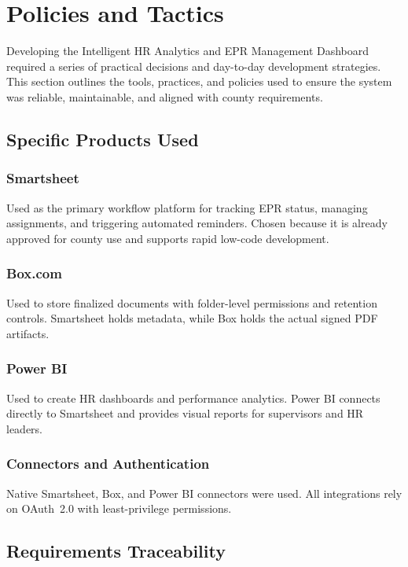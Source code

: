 \documentclass[12pt]{article}
\def\&{ and }%
\begin{document}
\section{Policies and Tactics}

Developing the Intelligent HR Analytics \& EPR Management Dashboard required a series of
practical decisions and day-to-day development strategies. This section outlines the tools,
practices, and policies used to ensure the system was reliable, maintainable, and aligned with
county requirements.

\subsection{Specific Products Used}

\subsubsection{Smartsheet}
Used as the primary workflow platform for tracking EPR status, managing assignments, and
triggering automated reminders. Chosen because it is already approved for county use and
supports rapid low-code development.

\subsubsection{Box.com}
Used to store finalized documents with folder-level permissions and retention controls.
Smartsheet holds metadata, while Box holds the actual signed PDF artifacts.

\subsubsection{Power BI}
Used to create HR dashboards and performance analytics. Power BI connects directly to
Smartsheet and provides visual reports for supervisors and HR leaders.

\subsubsection{Connectors and Authentication}
Native Smartsheet, Box, and Power BI connectors were used. All integrations rely on
OAuth~2.0 with least-privilege permissions.

\subsection{Requirements Traceability}
\end{document}

